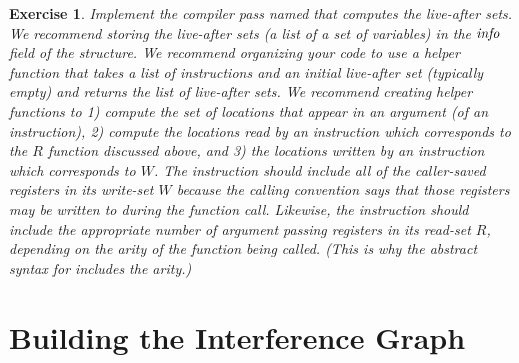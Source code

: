 \documentclass[11pt]{book}
\newtheorem{exercise}[theorem]{Exercise}
\begin{document}
\begin{exercise}\normalfont
Implement the compiler pass named  that computes
the live-after sets. We recommend storing the live-after sets (a list
of a set of variables) in the $\mathit{info}$ field of the 
structure.
%
We recommend organizing your code to use a helper function that takes
a list of instructions and an initial live-after set (typically empty)
and returns the list of live-after sets.
%
We recommend creating helper functions to 1) compute the set of
locations that appear in an argument (of an instruction), 2) compute
the locations read by an instruction which corresponds to the $R$
function discussed above, and 3) the locations written by an
instruction which corresponds to $W$. The  instruction
should include all of the caller-saved registers in its write-set $W$
because the calling convention says that those registers may be
written to during the function call. Likewise, the 
instruction should include the appropriate number of argument passing
registers in its read-set $R$, depending on the arity of the function
being called. (This is why the abstract syntax for 
includes the arity.)

\end{exercise}


\section{Building the Interference Graph}
\label{sec:build-interference}
\end{document}
